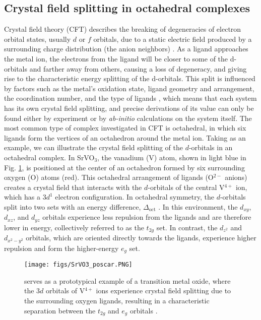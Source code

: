\documentclass[%
 reprint,
 amsmath,amssymb,
 aps,
]{revtex4-2}
\begin{document}
\subsection{Crystal field splitting in octahedral complexes}
Crystal field theory (CFT) describes the breaking of degeneracies of electron orbital states, usually $d$ or $f$ orbitals, due to a static electric field produced by a surrounding charge distribution (the anion neighbors) \cite{bethe1929termaufspaltung}. As a ligand approaches the metal ion, the electrons from the ligand will be closer to some of the d-orbitals and farther away from others, causing a loss of degeneracy, and giving rise to the characteristic energy splitting of the d-orbitals. This split is influenced by factors such as the metal's  oxidation state, ligand geometry and arrangement, the coordination number, and the type of ligands \cite{penney1932influence}, which means that each system has its own crystal field splitting, and precise derivations of its value can only be found either by experiment or by \textit{ab-initio} calculations on the system itself. 
The most common type of complex investigated in CFT is octahedral, in which six ligands form the vertices of an octahedron around the metal ion. 
Taking  as an example, we can illustrate the crystal field splitting of the \(d\)-orbitals in an octahedral complex. In SrVO\(_3\), the vanadium (V) atom, shown in light blue in Fig. \ref{fig:SrVO3_structure}, is positioned at the center of an octahedron formed by six surrounding oxygen (O) atoms (red). This octahedral arrangement of ligands (O\(^{2-}\) anions) creates a crystal field that interacts with the \(d\)-orbitals of the central V\(^{4+}\) ion, which has a \(3d^1\) electron configuration. In octahedral symmetry, the \(d\)-orbitals split into two sets with an energy difference, \(\Delta_{\text{oct}}\) \cite{InfluenceOfCrystallineFields, CFT_Theory}. In this environment, the \(d_{xy}\), \(d_{xz}\), and \(d_{yz}\) orbitals experience less repulsion from the ligands and are therefore lower in energy, collectively referred to as the \(t_{2g}\) set. In contrast, the \(d_{z^2}\) and \(d_{x^2-y^2}\) orbitals, which are oriented directly towards the ligands, experience higher repulsion and form the higher-energy \(e_g\) set. 
\begin{figure}[htb]
    \centering
    \texttt{[image: figs/SrVO3\_poscar.PNG]}
    \caption{ serves as a prototypical example of a transition metal oxide, where the \(3d\) orbitals of V\(^{4+}\) ions experience crystal field splitting due to the surrounding oxygen ligands, resulting in a characteristic separation between the \(t_{2g}\) and \(e_g\) orbitals \cite{Scaramucci2014}.}
    \label{fig:SrVO3_structure}
\end{figure}
\end{document}
